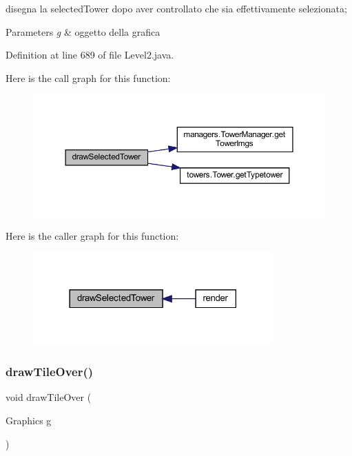 disegna la selected\+Tower dopo aver controllato che sia effettivamente selezionata; 


\begin{DoxyParams}{Parameters}
{\em g} & oggetto della grafica \\
\hline
\end{DoxyParams}


Definition at line 689 of file Level2.\+java.

Here is the call graph for this function\+:
\nopagebreak
\begin{figure}[H]
\begin{center}
\leavevmode
\includegraphics[width=350pt]{classscenes_1_1_level2_a0a97d0bb6d32640b2ae351707946abf7_cgraph}
\end{center}
\end{figure}
Here is the caller graph for this function\+:\nopagebreak
\begin{figure}[H]
\begin{center}
\leavevmode
\includegraphics[width=261pt]{classscenes_1_1_level2_a0a97d0bb6d32640b2ae351707946abf7_icgraph}
\end{center}
\end{figure}
\mbox{\label{classscenes_1_1_level2_ac299bbbbb70f97ae032c1345d5937378}} 
\subsubsection{\texorpdfstring{draw\+Tile\+Over()}{drawTileOver()}}
{\footnotesize\ttfamily void draw\+Tile\+Over (\begin{DoxyParamCaption}\item[{Graphics}]{g }\end{DoxyParamCaption})\hspace{0.3cm}{\ttfamily [private]}}



